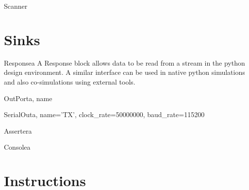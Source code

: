 \documentclass[letterpaper,10pt,english]{manual}
\begin{document}
\hypertarget{streams.Scanner}{}\begin{classdesc}{Scanner}{}\end{classdesc}


\section{Sinks}

\hypertarget{streams.Response}{}\begin{classdesc}{Response}{a}
A Response block allows data to be read from a stream in the python 
design environment. A similar interface can be used in native python
simulations and also co-simulations using external tools.
\end{classdesc}

\hypertarget{streams.OutPort}{}\begin{classdesc}{OutPort}{a, name}\end{classdesc}

\hypertarget{streams.SerialOut}{}\begin{classdesc}{SerialOut}{a, name='TX', clock\_rate=50000000, baud\_rate=115200}\end{classdesc}

\hypertarget{streams.Asserter}{}\begin{classdesc}{Asserter}{a}\end{classdesc}

\hypertarget{streams.Console}{}\begin{classdesc}{Console}{a}\end{classdesc}


\section{Instructions}
\end{document}
